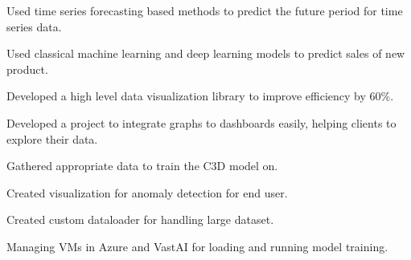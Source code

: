 \documentclass[]{puneet-resume}
\begin{document}
\begin{minipage}[t]{0.66\textwidth}
 
\noindent
\hspace{2.8em}%
\begin{minipage}{0.85\textwidth\vspace{0pt}}
\begin{tightemize}
	\item[] 
	\item {}
	\begin{subtightemize}
		\item Used time series forecasting based methods to predict the future period for time series data.
		\item Used classical machine learning and deep learning models to predict sales of new product.
	\end{subtightemize}
	\item {}
	\begin{subtightemize}
		\item Developed a high level data visualization library to improve efficiency by 60\%.
		\item Developed a project to integrate graphs to dashboards easily, helping clients to explore their data.
	\end{subtightemize}
\end{tightemize}
\end{minipage}
\sectionsep

 
\noindent
\hspace{2.8em}%
\begin{minipage}{0.85\textwidth\vspace{0pt}}
\begin{tightemize}
	\item {}
	\begin{subtightemize}
		\item Gathered appropriate data to train the C3D model on.
		\item Created visualization for anomaly detection for end user.
		\item Created custom dataloader for handling large dataset.
		\item Managing VMs in Azure and VastAI for loading and running model training.
	\end{subtightemize}
\end{tightemize}
\end{minipage}
\sectionsep

\end{minipage}
\end{document}
